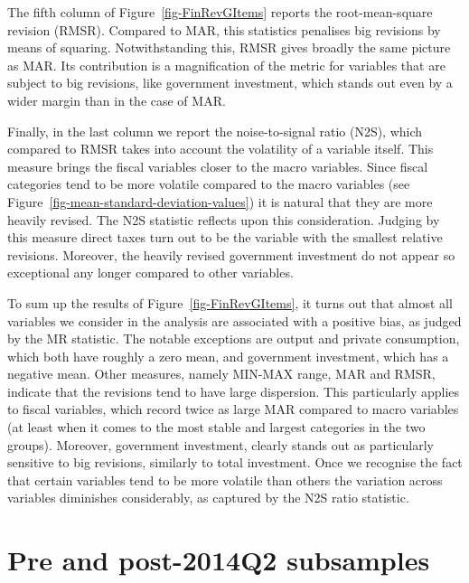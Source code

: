 \documentclass[
  letterpaper,
  authoryear,
  preprint,
  3p]{elsarticle}
\begin{document}
The fifth column of Figure~\ref{fig-FinRevGItems} reports the
root-mean-square revision (RMSR). Compared to MAR, this statistics
penalises big revisions by means of squaring. Notwithstanding this, RMSR
gives broadly the same picture as MAR. Its contribution is a
magnification of the metric for variables that are subject to big
revisions, like government investment, which stands out even by a wider
margin than in the case of MAR.

Finally, in the last column we report the noise-to-signal ratio (N2S),
which compared to RMSR takes into account the volatility of a variable
itself. This measure brings the fiscal variables closer to the macro
variables. Since fiscal categories tend to be more volatile compared to
the macro variables (see
Figure~\ref{fig-mean-standard-deviation-values}) it is natural that they
are more heavily revised. The N2S statistic reflects upon this
consideration. Judging by this measure direct taxes turn out to be the
variable with the smallest relative revisions. Moreover, the heavily
revised government investment do not appear so exceptional any longer
compared to other variables.

To sum up the results of Figure~\ref{fig-FinRevGItems}, it turns out
that almost all variables we consider in the analysis are associated
with a positive bias, as judged by the MR statistic. The notable
exceptions are output and private consumption, which both have roughly a
zero mean, and government investment, which has a negative mean. Other
measures, namely MIN-MAX range, MAR and RMSR, indicate that the
revisions tend to have large dispersion. This particularly applies to
fiscal variables, which record twice as large MAR compared to macro
variables (at least when it comes to the most stable and largest
categories in the two groups). Moreover, government investment, clearly
stands out as particularly sensitive to big revisions, similarly to
total investment. Once we recognise the fact that certain variables tend
to be more volatile than others the variation across variables
diminishes considerably, as captured by the N2S ratio statistic.

\hypertarget{pre-and-post-2014q2-subsamples}{%
\section{Pre and post-2014Q2
subsamples}\label{pre-and-post-2014q2-subsamples}}
\end{document}
